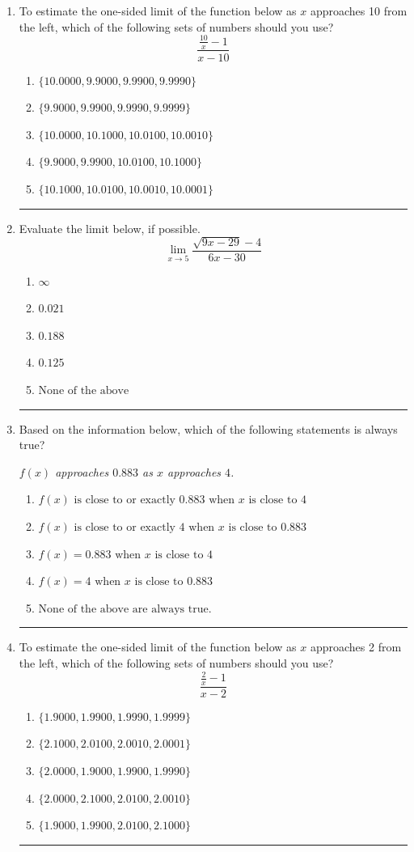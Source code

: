\documentclass[14pt]{extbook}
\newcommand{\litem}[1]{\item#1\hspace*{-1cm}\rule{\textwidth}{0.4pt}}
\begin{document}
\begin{enumerate}
{\begin{enumerate}[label=\Alph*.]
\end{enumerate} }
\litem{
To estimate the one-sided limit of the function below as $x$ approaches 10 from the left, which of the following sets of numbers should you use?\[ \frac{\frac{10}{x} - 1}{x - 10} \]\begin{enumerate}[label=\Alph*.]
\item \( \{ 10.0000, 9.9000, 9.9900, 9.9990 \} \)
\item \( \{ 9.9000, 9.9900, 9.9990, 9.9999 \} \)
\item \( \{ 10.0000, 10.1000, 10.0100, 10.0010 \} \)
\item \( \{ 9.9000, 9.9900, 10.0100, 10.1000 \} \)
\item \( \{ 10.1000, 10.0100, 10.0010, 10.0001 \} \)

\end{enumerate} }
\litem{
Evaluate the limit below, if possible.\[ \lim_{x \rightarrow 5} \frac{\sqrt{9x - 29} - 4}{6x - 30} \]\begin{enumerate}[label=\Alph*.]
\item \( \infty \)
\item \( 0.021 \)
\item \( 0.188 \)
\item \( 0.125 \)
\item \( \text{None of the above} \)

\end{enumerate} }
\litem{
Based on the information below, which of the following statements is always true?
\begin{center}
    \textit{ $f(x)$ approaches $0.883$ as $x$ approaches $4$. }
\end{center}
\begin{enumerate}[label=\Alph*.]
\item \( f(x) \text{ is close to or exactly } 0.883 \text{ when } x \text{ is close to } 4 \)
\item \( f(x) \text{ is close to or exactly } 4 \text{ when } x \text{ is close to } 0.883 \)
\item \( f(x) = 0.883 \text{ when } x \text{ is close to } 4 \)
\item \( f(x) = 4 \text{ when } x \text{ is close to } 0.883 \)
\item \( \text{None of the above are always true.} \)

\end{enumerate} }
\litem{
To estimate the one-sided limit of the function below as $x$ approaches 2 from the left, which of the following sets of numbers should you use?\[ \frac{\frac{2}{x} - 1}{x - 2} \]\begin{enumerate}[label=\Alph*.]
\item \( \{ 1.9000, 1.9900, 1.9990, 1.9999 \} \)
\item \( \{ 2.1000, 2.0100, 2.0010, 2.0001 \} \)
\item \( \{ 2.0000, 1.9000, 1.9900, 1.9990 \} \)
\item \( \{ 2.0000, 2.1000, 2.0100, 2.0010 \} \)
\item \( \{ 1.9000, 1.9900, 2.0100, 2.1000 \} \)


\end{enumerate}}
\end{enumerate}
\end{document}
